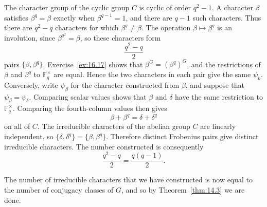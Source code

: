 \documentclass[../Odyssey_Project.tex]{subfiles}
\begin{document}
\begin{solution}
    The character group of the cyclic group $C$ is cyclic of order $q^2-1$. A character $\beta$ satisfies $\beta^q=\beta$ exactly when $\beta^{q-1}=1$, and there are $q-1$ such characters. Thus there are $q^2-q$ characters for which $\beta^q\neq\beta$. The operation $\beta\mapsto\beta^q$ is an involution, since $\beta^{q^2}=\beta$, so these characters form
    \[
        \frac{q^2-q}{2}
    \]
    pairs $\{\beta,\beta^q\}$. Exercise~\ref{ex:16.17} shows that $\beta^G=(\beta^q)^G$, and the restrictions of $\beta$ and $\beta^q$ to $\mathbb{F}_q^\times$ are equal. Hence the two characters in each pair give the same $\psi_k$.\\
    Conversely, write $\psi_\beta$ for the character constructed from $\beta$, and suppose that $\psi_\beta=\psi_\delta$. Comparing scalar values shows that $\beta$ and $\delta$ have the same restriction to $\mathbb{F}_q^\times$. Comparing the fourth-column values then gives
    \[
        \beta+\beta^q=\delta+\delta^q
    \]
    on all of $C$. The irreducible characters of the abelian group $C$ are linearly independent, so $\{\delta,\delta^q\}=\{\beta,\beta^q\}$. Therefore distinct Frobenius pairs give distinct irreducible characters. The number constructed is consequently
    \[
        \frac{q^2-q}{2}
        =
        \frac{q(q-1)}{2}.
    \]
\end{solution}

\noindent The number of irreducible characters that we have constructed is now equal to the number of conjugacy classes of $G$, and so by Theorem~\ref{thm:14.3} we are done.
\end{document}
